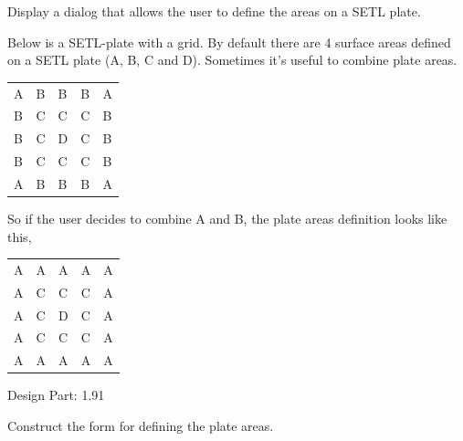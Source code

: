 \documentclass[letterpaper,10pt,english]{sphinxmanual}
\begin{document}
\begin{fulllineitems}
\label{setlyze/gui:setlyze.gui.DefinePlateAreas}
Display a dialog that allows the user to define the areas on a
SETL plate.

Below is a SETL-plate with a grid. By default there are 4 surface
areas defined on a SETL plate (A, B, C and D). Sometimes it's useful
to combine plate areas.

\begin{tabulary}{\linewidth}{|L|L|L|L|L|}
\hline

A
 & 
B
 & 
B
 & 
B
 & 
A
\\

B
 & 
C
 & 
C
 & 
C
 & 
B
\\

B
 & 
C
 & 
D
 & 
C
 & 
B
\\

B
 & 
C
 & 
C
 & 
C
 & 
B
\\

A
 & 
B
 & 
B
 & 
B
 & 
A
\\
\hline
\end{tabulary}


So if the user decides to combine A and B, the plate areas
definition looks like this,

\begin{tabulary}{\linewidth}{|L|L|L|L|L|}
\hline

A
 & 
A
 & 
A
 & 
A
 & 
A
\\

A
 & 
C
 & 
C
 & 
C
 & 
A
\\

A
 & 
C
 & 
D
 & 
C
 & 
A
\\

A
 & 
C
 & 
C
 & 
C
 & 
A
\\

A
 & 
A
 & 
A
 & 
A
 & 
A
\\
\hline
\end{tabulary}


Design Part: 1.91

\begin{fulllineitems}
\label{setlyze/gui:setlyze.gui.DefinePlateAreas.create_definition_table}
Construct the form for defining the plate areas.


\end{fulllineitems}
\end{fulllineitems}
\end{document}
